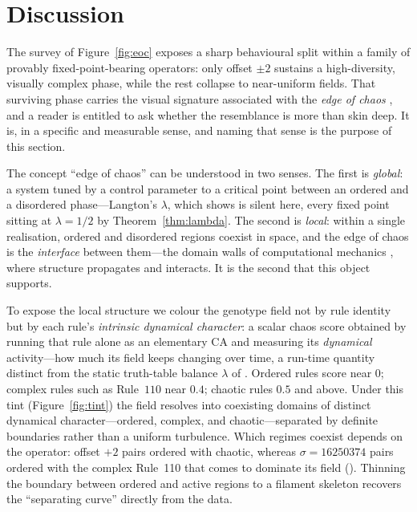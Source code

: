 \documentclass[man,12pt,floatsintext]{apa7}
\newcommand{\secref}[1]{\emph{\nameref{#1}}}
\begin{document}
\section{Discussion}
\label{sec:discussion}

The survey of Figure~\ref{fig:eoc} exposes a sharp behavioural split within a
family of provably fixed-point-bearing operators: only offset $\pm 2$ sustains a
high-diversity, visually complex phase, while the rest collapse to near-uniform
fields. That surviving phase carries the visual signature associated with
the \emph{edge of chaos} \parencite{langton1990computation}, and a reader is
entitled to ask whether the resemblance is more than skin deep. It is, in a specific and measurable sense, and naming that sense is the purpose of this
section.

The concept ``edge of chaos'' can be understood in two senses. The first is \emph{global}: a system
tuned by a control parameter to a critical point between an ordered and a
disordered phase---Langton's $\lambda$, which \secref{sec:lambda} shows is
silent here, every fixed point sitting at $\lambda = 1/2$ by
Theorem~\ref{thm:lambda}. The second is \emph{local}: within a single
realisation, ordered and disordered regions coexist in space, and the edge of
chaos is the \emph{interface} between them---the domain walls of computational
mechanics \parencite{crutchfield1989inferring,shalizi2001computational}, where
structure propagates and interacts. It is the second that this object supports.

To expose the local structure we colour the genotype field not by rule identity
but by each rule's \emph{intrinsic dynamical character}: a scalar chaos score
obtained by running that rule alone as an elementary CA and measuring its
\emph{dynamical} activity---how much its field keeps changing over time, a
run-time quantity distinct from the static truth-table balance $\lambda$ of
\secref{sec:lambda}. Ordered rules score near $0$; complex rules such as
Rule~$110$ near $0.4$; chaotic rules $0.5$ and above. Under this tint
(Figure~\ref{fig:tint}) the field resolves into coexisting domains of distinct
dynamical character---ordered, complex, and chaotic---separated by definite
boundaries rather than a uniform turbulence. Which regimes coexist depends on
the operator: offset $+2$ pairs ordered with chaotic, whereas
$\sigma = 16250374$ pairs ordered with the complex Rule~110 that comes to
dominate its field (\secref{sec:conclusion}). Thinning the boundary between
ordered and active regions to a filament skeleton recovers the ``separating
curve'' directly from the data.
\end{document}
